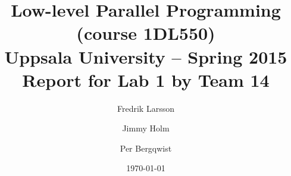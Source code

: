 \documentclass[a4paper,11pt]{article}
\title{\textbf{Low-level Parallel Programming (course 1DL550) \\
    Uppsala University -- Spring 2015 \\
    Report for Lab 1 by Team 14}}
\author{Fredrik Larsson \and Jimmy Holm \and Per Bergqwist}
\date{\today}
\begin{document}
\maketitle

\section{}
\end{document}
